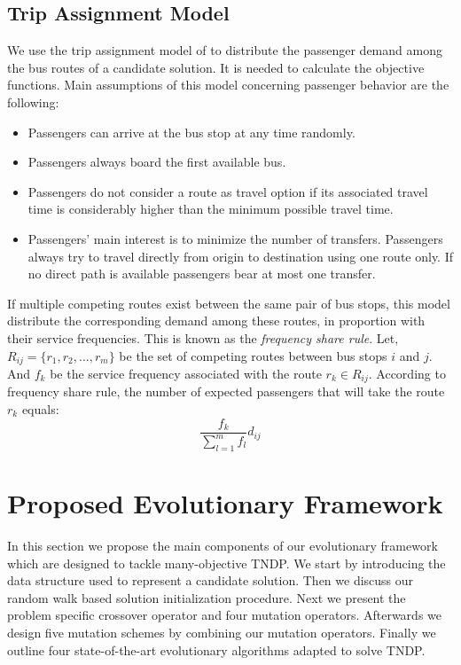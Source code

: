 \subsection{Trip Assignment Model}

We use the trip assignment model of \cite{baaj1990trust} to distribute the passenger demand among the bus routes of a candidate solution. It is needed to calculate the objective functions. Main assumptions of this model concerning passenger behavior are the following:

\begin{itemize}
	\item Passengers can arrive at the bus stop at any time randomly.

	\item Passengers always board the first available bus.

	\item Passengers do not consider a route as travel option if its associated travel time is considerably higher than the minimum possible travel time.

	\item Passengers' main interest is to minimize the number of transfers. Passengers always try to travel directly from origin to destination using one route only. If no direct path is available passengers bear at most one transfer.
\end{itemize}

If multiple competing routes exist between the same pair of bus stops, this model distribute the corresponding demand among these routes, in proportion with their service frequencies.  This is known as the \textit{frequency share rule}. Let, $ R_{ij} = \{r_1, r_2, \dots, r_m\} $ be the set of competing routes between bus stops $ i $ and $ j $. And $ f_k $ be the service frequency associated with the route $ r_k \in R_{ij} $. According to frequency share rule, the number of expected passengers that will take the route $ r_k $ equals:
\begin{equation}\label{eqn:frequency_share}
 \dfrac{f_k}{\sum_{l=1}^{m} f_l} d_{ij}
\end{equation}

\section{Proposed Evolutionary Framework}
In this section we propose the main components of our evolutionary framework which are designed to tackle many-objective TNDP. We start by introducing the data structure used to represent a candidate solution. Then we discuss our random walk based solution initialization procedure. Next we present the problem specific crossover operator and four mutation operators. Afterwards we design five mutation schemes by combining our mutation operators. Finally we outline four state-of-the-art evolutionary algorithms adapted to solve TNDP.

